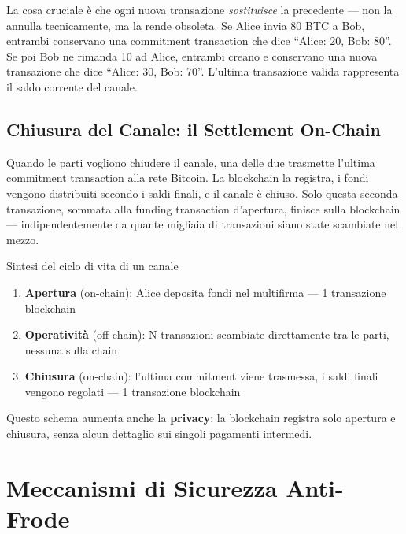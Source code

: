 \documentclass[
  italian,
  openany]{book}
\providecommand{\tightlist}{%
  \setlength{\itemsep}{0pt}\setlength{\parskip}{0pt}}
\begin{document}
La cosa cruciale è che ogni nuova transazione \emph{sostituisce} la
precedente --- non la annulla tecnicamente, ma la rende obsoleta. Se
Alice invia 80 BTC a Bob, entrambi conservano una commitment transaction
che dice ``Alice: 20, Bob: 80''. Se poi Bob ne rimanda 10 ad Alice,
entrambi creano e conservano una nuova transazione che dice ``Alice: 30,
Bob: 70''. L'ultima transazione valida rappresenta il saldo corrente del
canale.

\subsection{Chiusura del Canale: il Settlement
On-Chain}\label{chiusura-del-canale-il-settlement-on-chain}

Quando le parti vogliono chiudere il canale, una delle due trasmette
l'ultima commitment transaction alla rete Bitcoin. La blockchain la
registra, i fondi vengono distribuiti secondo i saldi finali, e il
canale è chiuso. Solo questa seconda transazione, sommata alla funding
transaction d'apertura, finisce sulla blockchain --- indipendentemente
da quante migliaia di transazioni siano state scambiate nel mezzo.

\begin{calloutnote}{Sintesi del ciclo di vita di un canale}

\begin{enumerate}
\def\labelenumi{\arabic{enumi}.}
\tightlist
\item
  \textbf{Apertura} (on-chain): Alice deposita fondi nel multifirma ---
  1 transazione blockchain
\item
  \textbf{Operatività} (off-chain): N transazioni scambiate direttamente
  tra le parti, nessuna sulla chain
\item
  \textbf{Chiusura} (on-chain): l'ultima commitment viene trasmessa, i
  saldi finali vengono regolati --- 1 transazione blockchain
\end{enumerate}

\end{calloutnote}

Questo schema aumenta anche la \textbf{privacy}: la blockchain registra
solo apertura e chiusura, senza alcun dettaglio sui singoli pagamenti
intermedi.

\section{Meccanismi di Sicurezza
Anti-Frode}\label{meccanismi-di-sicurezza-anti-frode}
\end{document}
